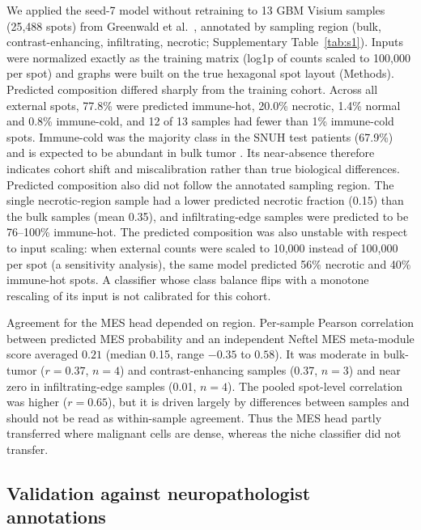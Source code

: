 \documentclass[11pt,letterpaper]{article}
\begin{document}
We applied the seed-7 model without retraining to 13 GBM Visium samples (25{,}488 spots) from Greenwald et al.\ \cite{greenwald2024}, annotated by sampling region (bulk, contrast-enhancing, infiltrating, necrotic; Supplementary Table~\ref{tab:s1}). Inputs were normalized exactly as the training matrix (log1p of counts scaled to 100{,}000 per spot) and graphs were built on the true hexagonal spot layout (Methods). Predicted composition differed sharply from the training cohort. Across all external spots, 77.8\% were predicted immune-hot, 20.0\% necrotic, 1.4\% normal and 0.8\% immune-cold, and 12 of 13 samples had fewer than 1\% immune-cold spots. Immune-cold was the majority class in the SNUH test patients (67.9\%) and is expected to be abundant in bulk tumor \cite{greenwald2024}. Its near-absence therefore indicates cohort shift and miscalibration rather than true biological differences. Predicted composition also did not follow the annotated sampling region. The single necrotic-region sample had a lower predicted necrotic fraction (0.15) than the bulk samples (mean 0.35), and infiltrating-edge samples were predicted to be 76--100\% immune-hot. The predicted composition was also unstable with respect to input scaling: when external counts were scaled to 10{,}000 instead of 100{,}000 per spot (a sensitivity analysis), the same model predicted 56\% necrotic and 40\% immune-hot spots. A classifier whose class balance flips with a monotone rescaling of its input is not calibrated for this cohort.

Agreement for the MES head depended on region. Per-sample Pearson correlation between predicted MES probability and an independent Neftel MES meta-module score \cite{neftel2019} averaged $0.21$ (median 0.15, range $-0.35$ to $0.58$). It was moderate in bulk-tumor ($r = 0.37$, $n = 4$) and contrast-enhancing samples (0.37, $n = 3$) and near zero in infiltrating-edge samples (0.01, $n = 4$). The pooled spot-level correlation was higher ($r = 0.65$), but it is driven largely by differences between samples and should not be read as within-sample agreement. Thus the MES head partly transferred where malignant cells are dense, whereas the niche classifier did not transfer.

\subsection{Validation against neuropathologist annotations}
\end{document}
